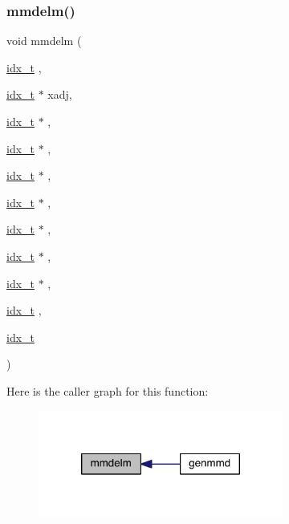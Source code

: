 \subsubsection{\texorpdfstring{mmdelm()}{mmdelm()}}
{\footnotesize\ttfamily void mmdelm (\begin{DoxyParamCaption}\item[{\hyperlink{a00876_aaa5262be3e700770163401acb0150f52}{idx\+\_\+t}}]{,  }\item[{\hyperlink{a00876_aaa5262be3e700770163401acb0150f52}{idx\+\_\+t} $\ast$}]{xadj,  }\item[{\hyperlink{a00876_aaa5262be3e700770163401acb0150f52}{idx\+\_\+t} $\ast$}]{,  }\item[{\hyperlink{a00876_aaa5262be3e700770163401acb0150f52}{idx\+\_\+t} $\ast$}]{,  }\item[{\hyperlink{a00876_aaa5262be3e700770163401acb0150f52}{idx\+\_\+t} $\ast$}]{,  }\item[{\hyperlink{a00876_aaa5262be3e700770163401acb0150f52}{idx\+\_\+t} $\ast$}]{,  }\item[{\hyperlink{a00876_aaa5262be3e700770163401acb0150f52}{idx\+\_\+t} $\ast$}]{,  }\item[{\hyperlink{a00876_aaa5262be3e700770163401acb0150f52}{idx\+\_\+t} $\ast$}]{,  }\item[{\hyperlink{a00876_aaa5262be3e700770163401acb0150f52}{idx\+\_\+t} $\ast$}]{,  }\item[{\hyperlink{a00876_aaa5262be3e700770163401acb0150f52}{idx\+\_\+t}}]{,  }\item[{\hyperlink{a00876_aaa5262be3e700770163401acb0150f52}{idx\+\_\+t}}]{ }\end{DoxyParamCaption})}

Here is the caller graph for this function\+:\nopagebreak
\begin{figure}[H]
\begin{center}
\leavevmode
\includegraphics[width=228pt]{a00945_a83c822b078dbc1e2dd4d838d1068a780_icgraph}
\end{center}
\end{figure}
\mbox{\label{a00945_af988a4c32a3ad8671066948abf7c2582}} 
